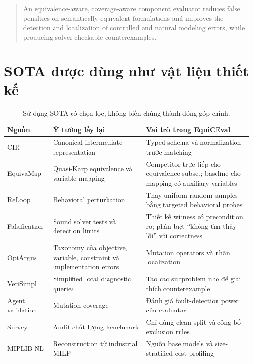 \documentclass[11pt,a4paper]{article}
\newcommand{\method}{\textsf{\textbf{EquiCEval}}\xspace}
\begin{document}
\begin{quote}
An equivalence-aware, coverage-aware component evaluator reduces false penalties on semantically equivalent formulations and improves the detection and localization of controlled and natural modeling errors, while producing solver-checkable counterexamples.
\end{quote}

\section{SOTA được dùng như vật liệu thiết kế}

\begin{table}[htbp]
\centering
\caption{Sử dụng SOTA có chọn lọc, không biến chúng thành đóng góp chính.}
\small
\begin{tabularx}{\textwidth}{L{3.1cm} L{3.3cm} Y}
\toprule
\textbf{Nguồn} & \textbf{Ý tưởng lấy lại} & \textbf{Vai trò trong \method} \\
\midrule
CIR \parencite{lyu2026cir} & Canonical intermediate representation & Typed schema và normalization trước matching \\
EquivaMap \parencite{zhai2025equivamap} & Quasi-Karp equivalence và variable mapping & Competitor trực tiếp cho equivalence subset; baseline cho mapping có auxiliary variables \\
ReLoop \parencite{lian2026reloop} & Behavioral perturbation & Thay uniform random samples bằng targeted behavioral probes \\
Falsification \parencite{li2026falsification} & Sound solver tests và detection limits & Thiết kế witness có precondition rõ; phân biệt ``không tìm thấy lỗi'' với correctness \\
OptArgus \parencite{li2026optargus} & Taxonomy của objective, variable, constraint và implementation errors & Mutation operators và nhãn localization \\
VeriSimpl \parencite{rahman2026verisimpl} & Simplified local diagnostic queries & Tạo các subproblem nhỏ để giải thích counterexample \\
Agent validation \parencite{zadorojniy2025validation} & Mutation coverage & Đánh giá fault-detection power của evaluator \\
Survey \parencite{xiao2025survey} & Audit chất lượng benchmark & Chỉ dùng clean split và công bố exclusion rules \\
MIPLIB-NL \parencite{li2026miplibnl} & Reconstruction từ industrial MILP & Nguồn base models và size-stratified cost profiling \\
\bottomrule
\end{tabularx}
\end{table}
\end{document}
